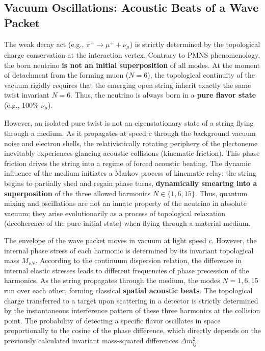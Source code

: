 \documentclass[11pt,a4paper]{article}
\begin{document}
\subsection{Vacuum Oscillations: Acoustic Beats of a Wave Packet}
The weak decay act (e.g., $\pi^+ \to \mu^+ + \nu_\mu$) is strictly determined by the topological charge conservation at the interaction vertex. Contrary to PMNS phenomenology, the born neutrino \textbf{is not an initial superposition} of all modes.
At the moment of detachment from the forming muon ($N=6$), the topological continuity of the vacuum rigidly requires that the emerging open string inherit exactly the same twist invariant $N=6$. Thus, the neutrino is always born in a \textbf{pure flavor state} (e.g., 100\% $\nu_\mu$).

However, an isolated pure twist is not an eigenstationary state of a string flying through a medium. As it propagates at speed $c$ through the background vacuum noise and electron shells, the relativistically rotating periphery of the plectoneme inevitably experiences glancing acoustic collisions (kinematic friction).
This phase friction drives the string into a regime of forced acoustic beating. The dynamic influence of the medium initiates a Markov process of kinematic relay: the string begins to partially shed and regain phase turns, \textbf{dynamically smearing into a superposition} of the three allowed harmonics $N \in \{1, 6, 15\}$.
Thus, quantum mixing and oscillations are not an innate property of the neutrino in absolute vacuum; they arise evolutionarily as a process of topological relaxation (decoherence of the pure initial state) when flying through a material medium.

The envelope of the wave packet moves in vacuum at light speed $c$. However, the internal phase stress of each harmonic is determined by its invariant topological mass $M_{\nu N}$. According to the continuum dispersion relation, the difference in internal elastic stresses leads to different frequencies of phase precession of the harmonics.
As the string propagates through the medium, the modes $N=1,6,15$ run over each other, forming classical \textbf{spatial acoustic beats}.
The topological charge transferred to a target upon scattering in a detector is strictly determined by the instantaneous interference pattern of these three harmonics at the collision point. The probability of detecting a specific flavor oscillates in space proportionally to the cosine of the phase difference, which directly depends on the previously calculated invariant mass-squared differences $\Delta m^2_{ij}$.
\end{document}
